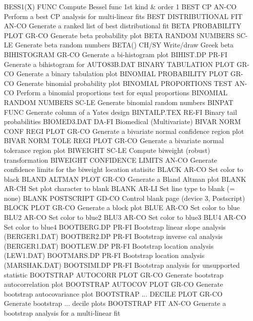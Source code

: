 BESS1(X)                    FUNC  Compute Bessel func 1st kind & order 1
BEST CP                     AN-CO Perform a best CP analysis for multi-linear fits
BEST DISTRIBUTIONAL FIT     AN-CO Generate a ranked list of best distributional fit
BETA PROBABILITY PLOT       GR-CO Generate beta probability plot
BETA RANDOM NUMBERS         SC-LE Generate beta random numbers
BETA()                      CH/SY Write/draw Greek beta
BIHISTOGRAM                 GR-CO Generate a bi-histogram plot
BIHIST.DP                   PR-FI Generate a bihistogram for AUTO83B.DAT
BINARY TABULATION PLOT      GR-CO Generate a binary tabulation plot
BINOMIAL PROBABILITY PLOT   GR-CO Generate binomial probability plot
BINOMIAL PROPORTIONS TEST   AN-CO Perform a binomial proportions test for equal proportions
BINOMIAL RANDOM NUMBERS     SC-LE Generate binomial random numbers
BINPAT                      FUNC  Generate column of a Yates design
BINTAILP.TEX                RE-FI Binary tail probabilities
BIOMED3.DAT                 DA-FI Biomedical (Multivariate)
BIVAR NORM CONF REGI PLOT   GR-CO Generate a bivariate normal confidence region plot
BIVAR NORM TOLE REGI PLOT   GR-CO Generate a bivariate normal tolerance region plot
BIWEIGHT                    SC-LE Compute biweight (robust) transformation
BIWEIGHT CONFIDENCE LIMITS  AN-CO Generate confidence limits for the biweight location statisitc
BLACK                       AR-CO Set color to black
BLAND ALTMAN PLOT           GR-CO Generate a Bland Altman plot
BLANK                       AR-CH Set plot character to blank
BLANK                       AR-LI Set line type to blank (= none)
BLANK POSTSCRIPT            GD-CO Control blank page (device 3, Postscript)
BLOCK PLOT                  GR-CO Generate a block plot
BLUE                        AR-CO Set color to blue
BLU2                        AR-CO Set color to blue2
BLU3                        AR-CO Set color to blue3
BLU4                        AR-CO Set color to blue4
BOOTBERG.DP                 PR-FI Bootstrap linear slope analysis (BERGER1.DAT)
BOOTBER2.DP                 PR-FI Bootstrap inverse cal analysis (BERGER1.DAT)
BOOTLEW.DP                  PR-FI Bootstrap location analysis (LEW1.DAT)
BOOTMARS.DP                 PR-FI Bootstrap location analysis (MARSHAK.DAT)
BOOTSIMI.DP                 PR-FI Bootstrap analysis for unsupported statistic
BOOTSTRAP AUTOCORR PLOT     GR-CO Generate bootstrap autocorrelation plot
BOOTSTRAP AUTOCOV PLOT      GR-CO Generate bootstrap autocovariance plot
BOOTSTRAP ... DECILE PLOT   GR-CO Generate bootstrap ... decile plots
BOOTSTRAP FIT               AN-CO Generate a bootstrap analysis for a multi-linear fit
